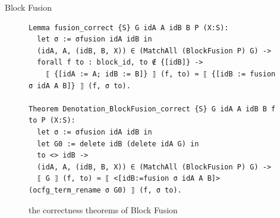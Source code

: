 \documentclass{beamer}
\begin{document}
\begin{frame}{Block Fusion}
  \begin{figure}
    \begin{lstlisting}[style=customcoq,basicstyle=\small\ttfamily]
Lemma fusion_correct {S} G idA A idB B P (X:S):
  let σ := σfusion idA idB in
  (idA, A, (idB, B, X)) ∈ (MatchAll (BlockFusion P) G) ->
  forall f to : block_id, to ∉ {[idB]} ->
    ⟦ {[idA := A; idB := B]} ⟧ (f, to) ≈ ⟦ {[idB := fusion σ idA A B]} ⟧ (f, σ to).

Theorem Denotation_BlockFusion_correct {S} G idA A idB B f to P (X:S):
  let σ := σfusion idA idB in
  let G0 := delete idB (delete idA G) in
  to <> idB ->
  (idA, A, (idB, B, X)) ∈ (MatchAll (BlockFusion P) G) ->
  ⟦ G ⟧ (f, to) ≈ ⟦ <[idB:=fusion σ idA A B]> (ocfg_term_rename σ G0) ⟧ (f, σ to).
        \end{lstlisting}
    \caption{the correctness theorems of Block Fusion}
    \label{fig:fusion_proof}
  \end{figure}
\end{frame}
\end{document}
